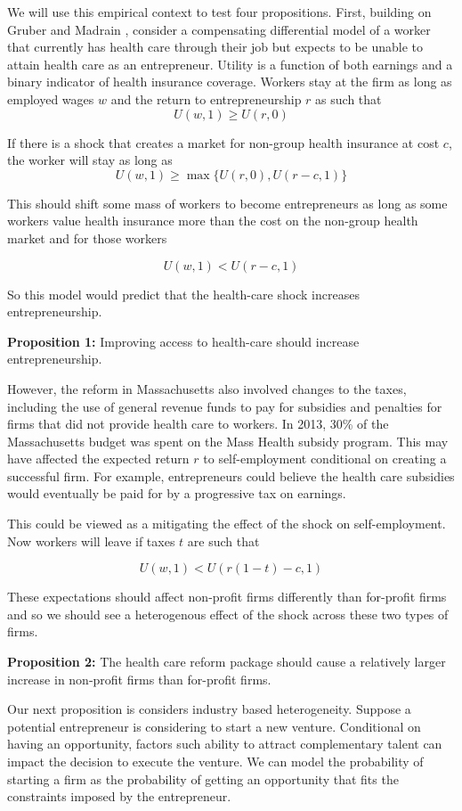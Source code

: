 \documentclass[12pt]{article}
\begin{document}
We will use this empirical context to test four propositions. First, building on Gruber and Madrain \cite{gm2002}, consider a compensating differential model of a worker that currently has health care through their job but expects to be unable to attain health care as an entrepreneur. Utility is a function of both earnings and a binary indicator of health insurance coverage. Workers stay at the firm as long as employed wages $w$ and the return to entrepreneurship $r$ as such that
$$U(w,1) \ge U(r,0)$$

If there is a shock that creates a market for non-group health insurance at cost $c$, the worker will stay as long as
$$U(w,1) \ge \max\{U(r,0),U(r-c,1)\}$$

This should shift some mass of workers to become entrepreneurs as long as some workers value health insurance more than the cost on the non-group health market and for those workers

$$U(w,1) < U(r-c,1)$$

So this model would predict that the health-care shock increases entrepreneurship. 

\textbf{Proposition 1:} 
Improving access to health-care should increase entrepreneurship. 

However, the reform in Massachusetts also involved changes to the taxes, including the use of general revenue funds to pay for subsidies and penalties for firms that did not provide health care to workers. In 2013, 30\% of the Massachusetts budget was spent on the Mass Health \cite{masshealth} subsidy program. This may have affected the expected  return $r$ to self-employment conditional on creating a successful firm. For example, entrepreneurs could believe the health care subsidies would eventually be paid for by a progressive tax on earnings.

This could be viewed as a mitigating the effect of the shock on self-employment. Now workers will leave if taxes $t$ are such that

$$U(w,1) < U(r(1-t)-c,1)$$

These expectations should affect non-profit firms differently than for-profit firms and so we should see a heterogenous effect of the shock across these two types of firms. 

\textbf{Proposition 2:} 
The health care reform package should cause a relatively larger increase in non-profit firms than for-profit firms. 

Our next proposition is considers industry based heterogeneity. Suppose a potential entrepreneur is considering to start a new venture. Conditional on having an opportunity, factors such ability to attract complementary talent \cite{stuartSorensen} can impact the decision to execute the venture. We can model the probability of starting a firm as the probability of getting an opportunity that fits the constraints imposed by the entrepreneur. 
\end{document}
